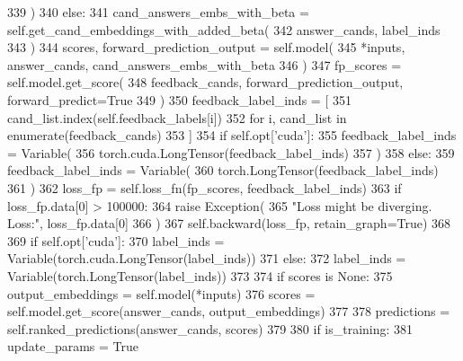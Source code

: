 \begin{DoxyCode}
339                     )
340                 \textcolor{keywordflow}{else}:
341                     cand\_answers\_embs\_with\_beta = self.get\_cand\_embeddings\_with\_added\_beta(
342                         answer\_cands, label\_inds
343                     )
344                     scores, forward\_prediction\_output = self.model(
345                         *inputs, answer\_cands, cand\_answers\_embs\_with\_beta
346                     )
347                     fp\_scores = self.model.get\_score(
348                         feedback\_cands, forward\_prediction\_output, forward\_predict=\textcolor{keyword}{True}
349                     )
350                     feedback\_label\_inds = [
351                         cand\_list.index(self.feedback\_labels[i])
352                         \textcolor{keywordflow}{for} i, cand\_list \textcolor{keywordflow}{in} enumerate(feedback\_cands)
353                     ]
354                     \textcolor{keywordflow}{if} self.opt[\textcolor{stringliteral}{'cuda'}]:
355                         feedback\_label\_inds = Variable(
356                             torch.cuda.LongTensor(feedback\_label\_inds)
357                         )
358                     \textcolor{keywordflow}{else}:
359                         feedback\_label\_inds = Variable(
360                             torch.LongTensor(feedback\_label\_inds)
361                         )
362                     loss\_fp = self.loss\_fn(fp\_scores, feedback\_label\_inds)
363                     \textcolor{keywordflow}{if} loss\_fp.data[0] > 100000:
364                         \textcolor{keywordflow}{raise} Exception(
365                             \textcolor{stringliteral}{"Loss might be diverging. Loss:"}, loss\_fp.data[0]
366                         )
367                     self.backward(loss\_fp, retain\_graph=\textcolor{keyword}{True})
368 
369             \textcolor{keywordflow}{if} self.opt[\textcolor{stringliteral}{'cuda'}]:
370                 label\_inds = Variable(torch.cuda.LongTensor(label\_inds))
371             \textcolor{keywordflow}{else}:
372                 label\_inds = Variable(torch.LongTensor(label\_inds))
373 
374         \textcolor{keywordflow}{if} scores \textcolor{keywordflow}{is} \textcolor{keywordtype}{None}:
375             output\_embeddings = self.model(*inputs)
376             scores = self.model.get\_score(answer\_cands, output\_embeddings)
377 
378         predictions = self.ranked\_predictions(answer\_cands, scores)
379 
380         \textcolor{keywordflow}{if} is\_training:
381             update\_params = \textcolor{keyword}{True}

\end{DoxyCode}
